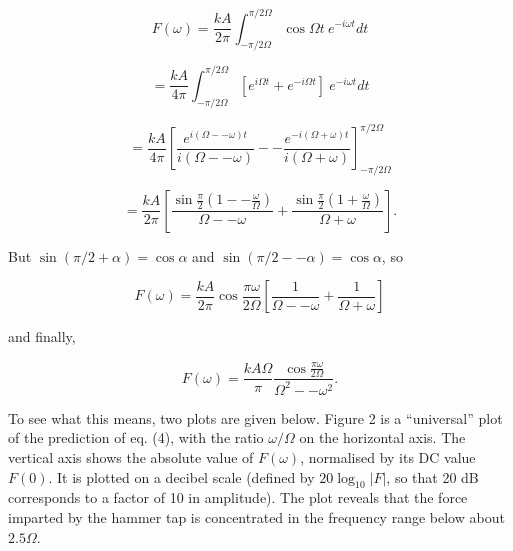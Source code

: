   \begin{equation*}F(\omega) = \dfrac{kA}{2 \pi} \int_{-\pi/2 \Omega}^{\pi/2 
  \Omega} \cos \Omega t~e^{-i \omega t} dt \tag{3}\end{equation*} 

  \begin{equation*} = \dfrac{kA}{4 \pi} \int_{-\pi/2 \Omega}^{\pi/2 \Omega} 
  \left[ e^{i \Omega t} + e^{-i \Omega t} \right]~e^{-i \omega t} dt 
  \end{equation*} 

  \begin{equation*}= \dfrac{kA}{4 \pi} \left[ \dfrac{e^{i (\Omega -- \omega) 
  t}}{i (\Omega -- \omega)} -- \dfrac{e^{-i (\Omega + \omega) t}}{i (\Omega + 
  \omega)} \right]_{-\pi/2 \Omega}^{\pi/2 \Omega} \end{equation*} 

  \begin{equation*}= \dfrac{kA}{2 \pi} \left[ \dfrac{\sin \frac{\pi}{2} \left(1 
  -- \frac{\omega}{\Omega} \right)}{\Omega -- \omega} + \dfrac{\sin 
  \frac{\pi}{2} \left(1 + \frac{\omega}{\Omega} \right)}{\Omega + \omega} 
  \right].\end{equation*} 

  But $\sin (\pi/2 + \alpha) = \cos \alpha$ and $\sin(\pi/2 -- \alpha)= \cos 
  \alpha$, so 

  \begin{equation*}F(\omega) = \dfrac{kA}{2 \pi} \cos \dfrac{\pi \omega}{2 
  \Omega} \left[ \dfrac{1}{\Omega -- \omega} + \dfrac{1}{\Omega + \omega} 
  \right] \end{equation*} 

  \noindent{}and finally, 

  \begin{equation*}F(\omega) = \dfrac{kA \Omega}{\pi} \dfrac{\cos \frac{\pi 
  \omega}{2 \Omega}}{\Omega^2 -- \omega^2}. \tag{4}\end{equation*} 

  To see what this means, two plots are given below. Figure 2 is a 
  ``universal'' plot of the prediction of eq. (4), with the ratio $\omega / 
  \Omega$ on the horizontal axis. The vertical axis shows the absolute value of 
  $F(\omega)$, normalised by its DC value $F(0)$. It is plotted on a decibel 
  scale (defined by $20\log_{10}|F|$, so that 20 dB corresponds to a factor of 
  10 in amplitude). The plot reveals that the force imparted by the hammer tap 
  is concentrated in the frequency range below about $2.5 \Omega$. 

